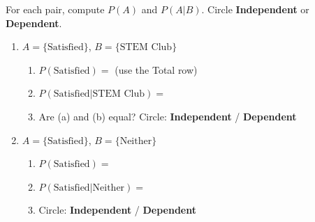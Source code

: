 \documentclass[10pt]{article}
\begin{document}
\begin{tcolorbox}[colback=greenbg, colframe=greenacc, boxrule=0.9pt, arc=2mm,
    left=3mm, right=3mm, top=2mm, bottom=2mm,
    title={\bfseries\small Tier R --- Remediate: Reading the Independence Check},
    fonttitle=\small]
\small
For each pair, compute $P(A)$ and $P(A|B)$. Circle \textbf{Independent} or \textbf{Dependent}.

\vspace{6pt}
\begin{enumerate}[leftmargin=1.5em, itemsep=10pt]
  \item $A = \{\text{Satisfied}\}$, $B = \{\text{STEM Club}\}$
        \begin{enumerate}[label=(\alph*), itemsep=4pt]
          \item $P(\text{Satisfied}) = $ \blank{4cm} (use the Total row)
          \item $P(\text{Satisfied} | \text{STEM Club}) = $ \blank{4cm}
          \item Are (a) and (b) equal? \blank{2cm} \quad Circle: \textbf{Independent} / \textbf{Dependent}
        \end{enumerate}

  \item $A = \{\text{Satisfied}\}$, $B = \{\text{Neither}\}$
        \begin{enumerate}[label=(\alph*), itemsep=4pt]
          \item $P(\text{Satisfied}) = $ \blank{4cm}
          \item $P(\text{Satisfied} | \text{Neither}) = $ \blank{4cm}
          \item Circle: \textbf{Independent} / \textbf{Dependent}
        \end{enumerate}
\end{enumerate}
\end{tcolorbox}

\vspace{0.1in}
\end{document}
